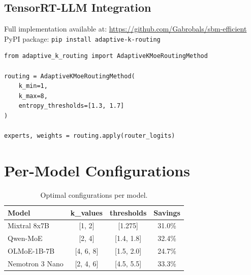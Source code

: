 \documentclass{article}
\begin{document}
\subsection{TensorRT-LLM Integration}

Full implementation available at: \url{https://github.com/Gabrobals/sbm-efficient}\\PyPI package: \texttt{pip install adaptive-k-routing}

\begin{lstlisting}
from adaptive_k_routing import AdaptiveKMoeRoutingMethod

routing = AdaptiveKMoeRoutingMethod(
    k_min=1,
    k_max=8,
    entropy_thresholds=[1.3, 1.7]
)

experts, weights = routing.apply(router_logits)
\end{lstlisting}

\section{Per-Model Configurations}

\begin{table}[h]
\centering
\begin{tabular}{lccc}
\toprule
\textbf{Model} & \textbf{k\_values} & \textbf{thresholds} & \textbf{Savings} \\
\midrule
Mixtral 8x7B & {[}1, 2{]} & {[}1.275{]} & 31.0\% \\
Qwen-MoE & {[}2, 4{]} & {[}1.4, 1.8{]} & 32.4\% \\
OLMoE-1B-7B & {[}4, 6, 8{]} & {[}1.5, 2.0{]} & 24.7\% \\
Nemotron 3 Nano & {[}2, 4, 6{]} & {[}4.5, 5.5{]} & 33.3\% \\
\bottomrule
\end{tabular}
\caption{Optimal configurations per model.}
\label{tab:configs}
\end{table}
\end{document}

